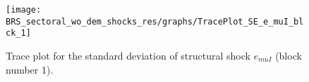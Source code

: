 \begin{figure}[H]
\centering
  \texttt{[image: BRS\_sectoral\_wo\_dem\_shocks\_res/graphs/TracePlot\_SE\_e\_muI\_blck\_1]}\\
    \caption{Trace plot for the standard deviation of structural shock ${e_{muI}}$ (block number 1).}
\end{figure}

